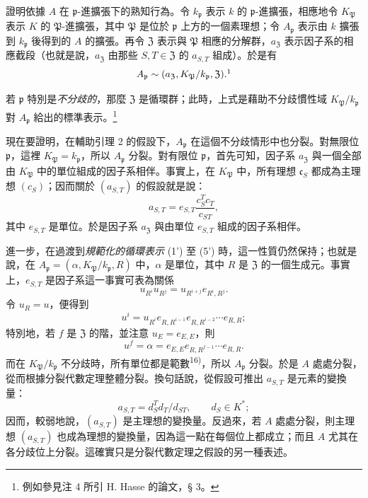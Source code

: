 \documentclass[11pt]{article}
\begin{document}
證明依據 \(A\) 在 \(\mathfrak p\)-進擴張下的熟知行為。令 \(k_{\mathfrak p}\) 表示 \(k\) 的 \(\mathfrak p\)-進擴張，相應地令 \(K_{\mathfrak P}\) 表示 \(K\) 的 \(\mathfrak P\)-進擴張，其中 \(\mathfrak P\) 是位於 \(\mathfrak p\) 上方的一個素理想；令 \(A_{\mathfrak p}\) 表示由 \(k\) 擴張到 \(k_{\mathfrak p}\) 後得到的 \(A\) 的擴張。再令 \(\mathfrak Z\) 表示與 \(\mathfrak P\) 相應的分解群，\(a_{\mathfrak Z}\) 表示因子系的相應截段（也就是說，\(a_{\mathfrak Z}\) 由那些 \(S,T\in\mathfrak Z\) 的 \(a_{S,T}\) 組成）。於是有
\[
A_{\mathfrak p}\sim(a_{\mathfrak Z},K_{\mathfrak P}/k_{\mathfrak p},\mathfrak Z).\footnotemark
\]

若 \(\mathfrak p\) 特別是\emph{不分歧的}，那麼 \(\mathfrak Z\) 是循環群；此時，上式是藉助不分歧慣性域 \(K_{\mathfrak P}/k_{\mathfrak p}\) 對 \(A_{\mathfrak p}\) 給出的標準表示。\footnote{例如參見注 4 所引 H. Hasse 的論文，§ 3。}

現在要證明，在輔助引理 2 的假設下，\(A_{\mathfrak p}\) 在這個不分歧情形中也分裂。對無限位 \(\mathfrak p\)，這裡 \(K_{\mathfrak P}=k_{\mathfrak p}\)，所以 \(A_{\mathfrak p}\) 分裂。對有限位 \(\mathfrak p\)，首先可知，因子系 \(a_{\mathfrak Z}\) 與一個全部由 \(K_{\mathfrak P}\) 中的單位組成的因子系相伴。事實上，在 \(K_{\mathfrak P}\) 中，所有理想 \(\mathfrak c_S\) 都成為主理想 \((c_S)\)；因而關於 \((a_{S,T})\) 的假設就是說：
\[
a_{S,T}=e_{S,T}\frac{c_S^Tc_T}{c_{ST}},
\]
其中 \(e_{S,T}\) 是單位。於是因子系 \(a_{\mathfrak Z}\) 與由單位 \(e_{S,T}\) 組成的因子系相伴。

進一步，在過渡到\emph{規範化的循環表示} (1') 至 (5') 時，這一性質仍然保持；也就是說，在 \(A_{\mathfrak p}=(\alpha,K_{\mathfrak P}/k_{\mathfrak p},R)\) 中，\(\alpha\) 是單位，其中 \(R\) 是 \(\mathfrak Z\) 的一個生成元。事實上，\(e_{S,T}\) 是因子系這一事實可表為關係
\[
u_{R^i}u_{R^j}=u_{R^{i+j}}e_{R^i,R^j}.
\]
令 \(u_R=u\)，便得到
\[
u^i=u_{R^i}e_{R,R^{i-1}}e_{R,R^{i-2}}\cdots e_{R,R};
\]
特別地，若 \(f\) 是 \(\mathfrak Z\) 的階，並注意 \(u_E=e_{E,E}\)，則
\[
u^f=\alpha=e_{E,E}e_{R,R^{f-1}}\cdots e_{R,R}.
\]
而在 \(K_{\mathfrak P}/k_{\mathfrak p}\) 不分歧時，所有單位都是範數\textsuperscript{16)}，所以 \(A_{\mathfrak p}\) 分裂。於是 \(A\) 處處分裂，從而根據分裂代數定理整體分裂。換句話說，從假設可推出 \(a_{S,T}\) 是元素的變換量：
\[
a_{S,T}=d_S^Td_T/d_{ST},\qquad d_S\in K^*;
\]
因而，較弱地說，\((a_{S,T})\) 是主理想的變換量。反過來，若 \(A\) 處處分裂，則主理想 \((a_{S,T})\) 也成為理想的變換量，因為這一點在每個位上都成立；而且 \(A\) 尤其在各分歧位上分裂。這確實只是分裂代數定理之假設的另一種表述。
\end{document}

